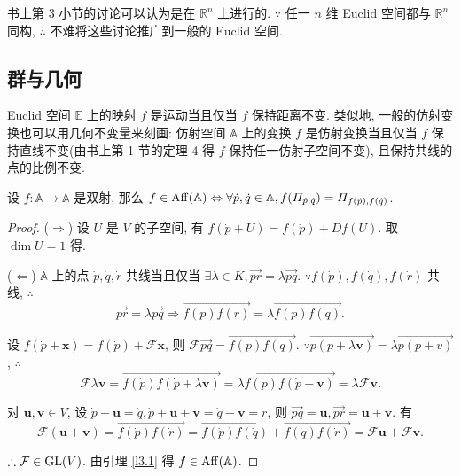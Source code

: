 \documentclass[color=black,device=normal,lang=cn,mode=geye]{elegantnote}
\begin{document}
书上第 3 小节的讨论可以认为是在 $\mathbb{R}^n$ 上进行的. $\because$ 任一 $n$ 维 Euclid 空间都与 $\mathbb{R}^n$ 同构, $\therefore$ 不难将这些讨论推广到一般的 Euclid 空间.
\subsection{群与几何}
Euclid 空间 $\mathbb{E}$ 上的映射 $f$ 是运动当且仅当 $f$ 保持距离不变. 类似地, 一般的仿射变换也可以用几何不变量来刻画: 仿射空间 $\mathbb{A}$ 上的变换 $f$ 是仿射变换当且仅当 $f$ 保持直线不变(由书上第 1 节的定理 4 得 $f$ 保持任一仿射子空间不变), 且保持共线的点的比例不变.
\begin{theorem}[书上的定理 9]
    设 $f:\mathbb{A}\to\mathbb{A}$ 是双射, 那么 $f\in\operatorname{Aff} (\mathbb{A})\Leftrightarrow\forall\dot{p},\dot{q}\in\mathbb{A},f(\varPi_{\dot{p},\dot{q}})=\varPi_{f(\dot{p}),f(\dot{q})}$.
\end{theorem}
\begin{proof}
    ($\Rightarrow$) 设 $U$ 是 $V$ 的子空间, 有 $f(\dot{p}+U)=f(\dot{p})+Df(U)$. 取 $\dim U=1$ 得.

    ($\Leftarrow$) $\mathbb{A}$ 上的点 $\dot{p},\dot{q},\dot{r}$ 共线当且仅当 $\exists\lambda\in K,\overrightarrow{pr}=\lambda\overrightarrow{pq}$. $\because f(\dot{p}),f(\dot{q}),f(\dot{r})$ 共线, $\therefore$
    \[\overrightarrow{pr}=\lambda\overrightarrow{pq}\Rightarrow\overrightarrow{f(p)f(r)}=\lambda\overrightarrow{f(p)f(q)}.\]

    设 $f(\dot{p}+\boldsymbol{x})=f(\dot{p})+\mathcal{F}\boldsymbol{x}$, 则 $\mathcal{F}\overrightarrow{pq}=\overrightarrow{f(p)f(q)}$. $\because\overrightarrow{p(p+\lambda\boldsymbol{v})}=\lambda\overrightarrow{p(p+v)}$, $\therefore$
    \[\mathcal{F}\lambda\boldsymbol{v}=\overrightarrow{f(\dot{p})f(\dot{p}+\lambda\boldsymbol{v})}=\lambda\overrightarrow{f(\dot{p})f(\dot{p}+\boldsymbol{v})}=\lambda\mathcal{F}\boldsymbol{v}.\]

    对 $\boldsymbol{u},\boldsymbol{v}\in V$, 设 $\dot{p}+\boldsymbol{u}=\dot{q},\dot{p}+\boldsymbol{u}+\boldsymbol{v}=\dot{q}+\boldsymbol{v}=\dot{r}$, 则 $\overrightarrow{pq}=\boldsymbol{u},\overrightarrow{pr}=\boldsymbol{u}+\boldsymbol{v}$. 有
    \[\mathcal{F}(\boldsymbol{u}+\boldsymbol{v})=\overrightarrow{f(\dot{p})f(\dot{r})}=\overrightarrow{f(\dot{p})f(\dot{q})}+\overrightarrow{f(\dot{q})f(\dot{r})}=\mathcal{F}\boldsymbol{u}+\mathcal{F}\boldsymbol{v}.\]

    $\therefore\mathcal{F}\in\operatorname{GL} (V)$. 由引理 \ref{l3.1} 得 $f\in\operatorname{Aff} (\mathbb{A})$.
\end{proof}
\end{document}
